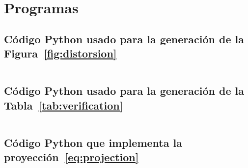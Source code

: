 \chapter{Programas}

\section{Código Python usado para la generación de la Figura~\ref{fig:distorsion}}

\begin{listing}[ht!]
	\tiny
	\centering
	\inputminted[frame=single,framesep=10pt,firstline=1,lastline=56,linenos]{python}{../python/figura21.py}
	\caption{Código Python para calcular la distorsión promedio de
		$500$ pares de puntos de una distribución uniforme en $\left[0,1\right]^{d}$
		al proyectarlos a un subespacio de dimensión $k=4295$ cuando $d=100000$.}
\end{listing}

\section{Código Python usado para la generación de la Tabla~\ref{tab:verification}}

\begin{listing}[ht!]
	\tiny
	\centering
	\inputminted[frame=single,framesep=10pt,linenos]{python}{../python/tabla51.py}
	\caption{Código Python para estimar la probabilidad del
		Teorema~\ref{thm:johnson-lindenstrauss} para distintos valores de
		$\varepsilon$ y dimensiones de proyección $k$.}
\end{listing}

\newpage

\section{Código Python que implementa la proyección~\eqref{eq:projection}}\label{sec:projection}

\begin{listing}[ht!]
	\tiny
	\centering
	\inputminted[frame=single,framesep=10pt,linenos]{python}{../python/johnson.py}
	\caption{Código Python que implementa la proyección de Johnson-Lindenstrauss $T_{U\left(\omega\right)}$ para $d$ pequeño y $k$ en~\ref{lst:results3a}.}
\end{listing}
